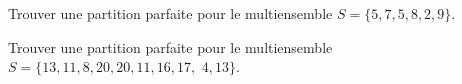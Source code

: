 \documentclass[11pt]{article}
\begin{document}



    

  \begin{exercice}{}
    Trouver une partition parfaite pour le multiensemble $S=\{5, 7, 5, 8, 2, 9\}$.
  \end{exercice}


  \begin{exercice}{}
    Trouver une partition parfaite pour le multiensemble $S=\{13, 11, 8, 20, 20, 11, 16, 17,$ $ 4, 13\}$.
  \end{exercice}
\end{document}

